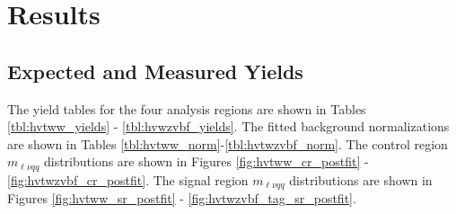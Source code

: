 \chapter{Results}
\section{Expected and Measured Yields}
The yield tables for the four analysis regions are shown in Tables \ref{tbl:hvtww_yields} - \ref{tbl:hvwzvbf_yields}. The fitted background normalizations are shown in Tables \ref{tbl:hvtww_norm}-\ref{tbl:hvtwzvbf_norm}. The control region $m_{\ell\nu qq}$ distributions are shown in Figures \ref{fig:hvtww_cr_postfit} - \ref{fig:hvtwzvbf_cr_postfit}. The signal region $m_{\ell\nu qq}$ distributions are shown in Figures \ref{fig:hvtww_sr_postfit} - \ref{fig:hvtwzvbf_tag_sr_postfit}.
